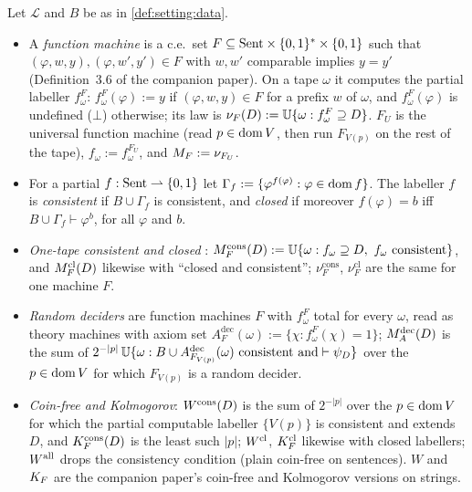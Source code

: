\begin{definition}\label{def:soi:objects}
Let $\mathcal L$ and $B$ be as in \cref{def:setting:data}.
\begin{itemize}[leftmargin=*]
\item A \emph{function machine} is a c.e.\ set $F\subseteq\mathrm{Sent}\times\{0,1\}^*\times\{0,1\}$ such that $(\varphi,w,y),(\varphi,w',y')\in F$ with $w,w'$ comparable implies $y=y'$ (Definition~3.6 of the companion paper). On a tape $\omega$ it computes the partial labeller $f^F_\omega$: $f^F_\omega(\varphi):=y$ if $(\varphi,w,y)\in F$ for a prefix $w$ of $\omega$, and $f^F_\omega(\varphi)$ is undefined ($\bot$) otherwise; its law is $\nu_F(D):=\mathbb{U}\{\omega:f^F_\omega\supseteq D\}$. $F_U$ is the universal function machine (read $p\in\operatorname{dom} V$, then run $F_{V(p)}$ on the rest of the tape), $f_\omega:=f^{F_U}_\omega$, and $M_{F}:=\nu_{F_U}$.
\item For a partial $f:\mathrm{Sent}\rightharpoonup\{0,1\}$ let $\Gamma_f:=\{\varphi^{f(\varphi)}:\varphi\in\operatorname{dom} f\}$. The labeller $f$ is \emph{consistent} if $B\cup\Gamma_f$ is consistent, and \emph{closed} if moreover $f(\varphi)=b$ iff $B\cup\Gamma_f\vdash\varphi^b$, for all $\varphi$ and $b$.
\item \emph{One-tape consistent and closed \SOIabbr}: $\MFcons(D):=\Unif\{\omega:f_\omega\supseteq D,\ f_\omega\text{ consistent}\}$, and $M_{F}^{\mathrm{cl}}(D)$ likewise with ``closed and consistent''; $\nu^{\mathrm{cons}}_F$, $\nu^{\mathrm{cl}}_F$ are the same for one machine $F$.
\item \emph{Random deciders} are function machines $F$ with $f^F_\omega$ total for every $\omega$, read as theory machines with axiom set $A^{\mathrm{dec}}_F(\omega):=\{\chi:f^F_\omega(\chi)=1\}$; $M_{A}^{\mathrm{dec}}(D)$ is the sum of $2^{-\lvert p\rvert}\,\mathbb{U}\{\omega:B\cup A^{\mathrm{dec}}_{F_{V(p)}}(\omega)\text{ consistent and}\vdash\psi_D\}$ over the $p\in\operatorname{dom} V$ for which $F_{V(p)}$ is a random decider.
\item \emph{Coin-free and Kolmogorov}: $W^{\mathrm{cons}}(D)$ is the sum of $2^{-\lvert p\rvert}$ over the $p\in\operatorname{dom} V$ for which the partial computable labeller $\{V(p)\}$ is consistent and extends $D$, and $K_{F}^{\mathrm{cons}}(D)$ is the least such $\lvert p\rvert$; $W^{\mathrm{cl}}$, $K_{F}^{\mathrm{cl}}$ likewise with closed labellers; $W^{\mathrm{all}}$ drops the consistency condition (plain coin-free \SOIabbr on sentences). $W$ and $K_{F}$ are the companion paper's coin-free and Kolmogorov versions on strings.
\end{itemize}
\end{definition}

